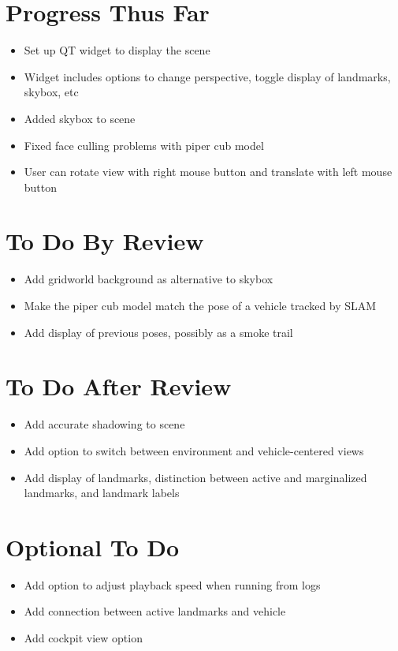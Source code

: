 \documentclass[11pt]{article}
\begin{document}
\thispagestyle{empty}

\newlength{\boxlength}\setlength{\boxlength}{\textwidth}
\addtolength{\boxlength}{-4mm}

\begin{center}
\end{center}

\section*{Progress Thus Far}
\begin{itemize}
	\item Set up QT widget to display the scene
	\item Widget includes options to change perspective, toggle display of landmarks, skybox, etc
	\item Added skybox to scene
	\item Fixed face culling problems with piper cub model
	\item User can rotate view with right mouse button and translate with left mouse button
\end{itemize}

\section*{To Do By Review}
\begin{itemize}
	\item Add gridworld background as alternative to skybox
	\item Make the piper cub model match the pose of a vehicle tracked by SLAM
	\item Add display of previous poses, possibly as a smoke trail
\end{itemize}

\section*{To Do After Review}
\begin{itemize}
	\item Add accurate shadowing to scene
	\item Add option to switch between environment and vehicle-centered views
	\item Add display of landmarks, distinction between active and marginalized landmarks, and landmark labels
\end{itemize}

\section*{Optional To Do}
\begin{itemize}
	\item Add option to adjust playback speed when running from logs
	\item Add connection between active landmarks and vehicle
	\item Add cockpit view option
\end{itemize}
\end{document}
